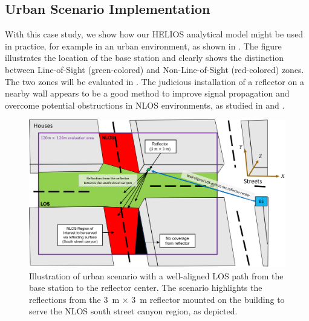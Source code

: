 \subsection{Urban Scenario Implementation}\label{Urban Scenario Implementation}
With this case study, we show how our HELIOS analytical model might be used in practice, for example in an urban environment, as shown in . The figure illustrates the location of the base station and clearly shows the distinction between Line-of-Sight (green-colored) and Non-Line-of-Sight (red-colored) zones. The two zones will be evaluated in . The judicious installation of a reflector on a nearby wall appears to be a good method to improve signal propagation and overcome potential obstructions in NLOS environments, as studied in  and .
\begin{figure}[H]
	\centering
	\includegraphics[width=1.0\linewidth]{images/Section 4 Images/Scenario1}
	\caption{Illustration of urban scenario \cite{Helios} with a well-aligned LOS path from the base station to the reflector center. The scenario highlights the reflections from the \SI{3}{\meter} $\times$ \SI{3}{\meter} reflector mounted on the building to serve the NLOS south street canyon region, as depicted.}
	\label{fig:Scenario1}
\end{figure}

